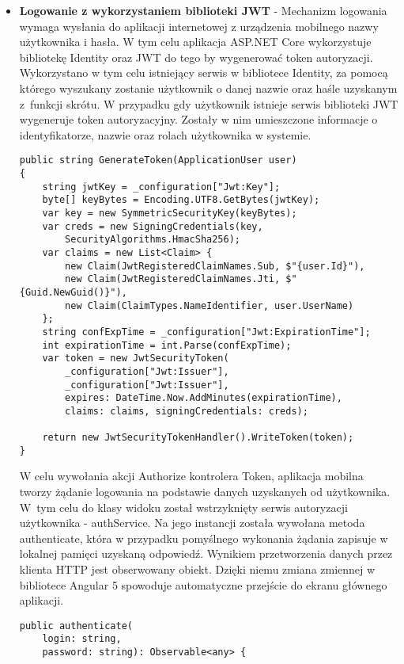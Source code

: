 \begin{itemize}
\item \textbf{Logowanie z wykorzystaniem biblioteki JWT} - Mechanizm logowania wymaga wysłania do aplikacji internetowej z urządzenia mobilnego nazwy użytkownika i hasła. W tym celu aplikacja ASP.NET Core wykorzystuje bibliotekę Identity oraz JWT do tego by wygenerować token autoryzacji. Wykorzystano w tym celu istniejący serwis w bibliotece Identity, za pomocą którego wyszukany zostanie użytkownik o danej nazwie oraz haśle uzyskanym z~funkcji skrótu. W przypadku gdy użytkownik istnieje serwis biblioteki JWT wygeneruje token autoryzacyjny. Zostały w nim umieszczone informacje o identyfikatorze, nazwie oraz rolach użytkownika w systemie.

\begin{lstlisting}[caption=Metoda generująca token JWT.]
 public string GenerateToken(ApplicationUser user)
{
	string jwtKey = _configuration["Jwt:Key"];
	byte[] keyBytes = Encoding.UTF8.GetBytes(jwtKey);
	var key = new SymmetricSecurityKey(keyBytes);
	var creds = new SigningCredentials(key,
		SecurityAlgorithms.HmacSha256);
	var claims = new List<Claim> {
		new Claim(JwtRegisteredClaimNames.Sub, $"{user.Id}"),
		new Claim(JwtRegisteredClaimNames.Jti, $"{Guid.NewGuid()}"),
		new Claim(ClaimTypes.NameIdentifier, user.UserName)
	};
	string confExpTime = _configuration["Jwt:ExpirationTime"];
	int expirationTime = int.Parse(confExpTime);
	var token = new JwtSecurityToken(
		_configuration["Jwt:Issuer"],
		_configuration["Jwt:Issuer"],
		expires: DateTime.Now.AddMinutes(expirationTime),
		claims: claims, signingCredentials: creds);
	
	return new JwtSecurityTokenHandler().WriteToken(token);
}
\end{lstlisting} 

W celu wywołania akcji Authorize kontrolera Token, aplikacja mobilna tworzy żądanie logowania na podstawie danych uzyskanych od użytkownika. W~tym celu do klasy widoku został wstrzyknięty serwis autoryzacji użytkownika - authService. Na jego instancji została wywołana metoda authenticate, która w przypadku pomyślnego wykonania żądania zapisuje w lokalnej pamięci uzyskaną odpowiedź. Wynikiem przetworzenia danych przez klienta HTTP jest obserwowany obiekt. Dzięki niemu zmiana zmiennej w bibliotece Angular 5 spowoduje automatyczne przejście do ekranu głównego aplikacji.

\begin{lstlisting}[caption=Metoda autoryzacji urządzenia mobilnego.]
public authenticate(
	login: string, 
	password: string): Observable<any> {
	

\end{lstlisting}
\end{itemize}
